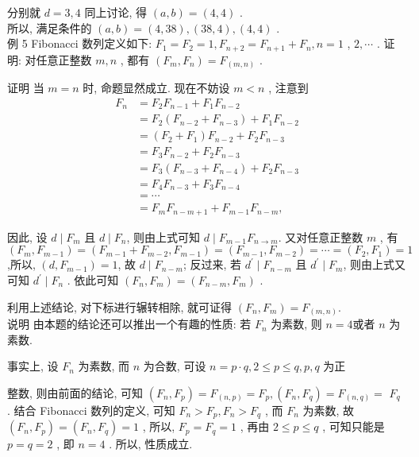 分别就 $d=3,4$ 同上讨论, 得 $(a, b)=(4,4)$ . \\
所以, 满足条件的 $(a, b)=(4,38),(38,4),(4,4)$ . \\
例 5 Fibonacci 数列定义如下:  $F_{1}=F_{2}=1, F_{n+2}=F_{n+1}+F_{n}, n=1$ ,  $2, \cdots$ . 证明: 对任意正整数 $m ,  n$ , 都有 $\left(F_{m}, F_{n}\right)=F_{(m, n)}$ .

证明 当 $m=n$ 时, 命题显然成立. 现在不妨设 $m<n$ , 注意到\begin{align}
	F_{n} & =F_{2} F_{n-1}+F_{1} F_{n-2}                     \\
	      & =F_{2}\left(F_{n-2}+F_{n-3}\right)+F_{1} F_{n-2} \\
	      & =\left(F_{2}+F_{1}\right) F_{n-2}+F_{2} F_{n-3}  \\
	      & =F_{3} F_{n-2}+F_{2} F_{n-3}                     \\
	      & =F_{3}\left(F_{n-3}+F_{n-4}\right)+F_{2} F_{n-3} \\
	      & =F_{4} F_{n-3}+F_{3} F_{n-4}                     \\
	      & =\cdots                                          \\
	      & =F_{m} F_{n-m+1}+F_{m-1} F_{n-m},
\end{align}

因此, 设 $d \mid F_{m}$ 且 $d \mid F_{n}$, 则由上式可知 $d \mid F_{m-1} F_{n \rightarrow m}$. 又对任意正整数 $m$ , 有 $\left(F_{m}, F_{m-1}\right)=\left(F_{m-1}+F_{m-2}, F_{m-1}\right)=\left(F_{m-1}, F_{m-2}\right)=\cdots=\left(F_{2}, F_{1}\right)=1$,所以, $\left(d, F_{m-1}\right)=1$, 故 $d \mid F_{n-m}$; 反过来, 若 $d^{\prime} \mid F_{n-m}$ 且 $d^{\prime} \mid F_{m}$, 则由上式又可知 $d^{\prime} \mid F_{n}$ . 依此可知 $\left(F_{n}, F_{m}\right)=\left(F_{n-m}, F_{m}\right)$ .

利用上述结论, 对下标进行辗转相除, 就可证得 $\left(F_{n}, F_{m}\right)=F_{(m, n)}$.\\
说明 由本题的结论还可以推出一个有趣的性质: 若 $F_{n}$ 为素数, 则 $n=4$或者 $n$ 为素数.

事实上, 设 $F_{n}$ 为素数, 而 $n$ 为合数, 可设 $n=p \cdot q, 2 \leqslant p \leqslant q, p ,  q$ 为正

整数, 则由前面的结论, 可知 $\left(F_{n}, F_{p}\right)=F_{(n, p)}=F_{p},\left(F_{n}, F_{q}\right)=F_{(n, q)}=$ $F_{q}$ . 结合 Fibonacci 数列的定义, 可知 $F_{n}>F_{p}, F_{n}>F_{q}$ , 而 $F_{n}$ 为素数, 故 $\left(F_{n}, F_{p}\right)=\left(F_{n}, F_{q}\right)=1$ , 所以,  $F_{p}=F_{q}=1$ , 再由 $2 \leqslant p \leqslant q$ , 可知只能是 $p=q=2$ , 即 $n=4$ . 所以, 性质成立.

